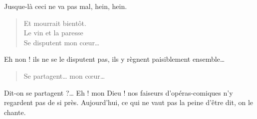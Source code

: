\documentclass[11pt]{book}
\begin{document}
Jusque-là ceci ne va pas mal, hein, hein.

\begin{verse}
  Et mourrait bientôt.\\
Le vin et la paresse\\
Se disputent mon cœur…
\end{verse}


Eh non ! ils ne se le disputent pas, ils y règnent paisiblement ensemble…

\begin{verse}
Se partagent… mon cœur…
\end{verse}

Dit-on se partagent ?… Eh ! mon Dieu ! nos faiseurs d’opéras-comiques n’y regardent pas de si près. Aujourd’hui, ce qui ne vaut pas la peine d’être dit, on le chante.
\end{document}
